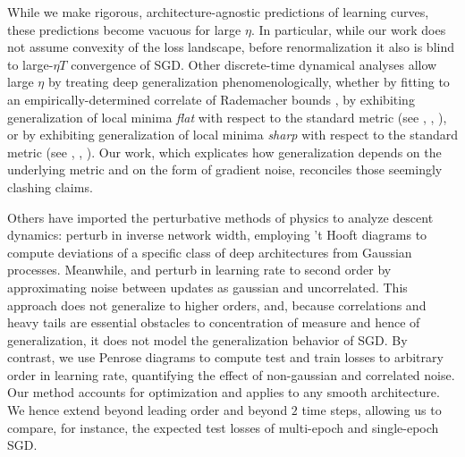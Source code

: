 \documentclass{article}
\begin{document}
    While we make rigorous, architecture-agnostic predictions of learning
    curves, these predictions become vacuous for large $\eta$.  In particular,
    while our work does not assume convexity of the loss landscape, before
    renormalization it also is blind to large-$\eta T$ convergence of SGD.
    Other discrete-time dynamical analyses allow large $\eta$ by treating deep
    generalization phenomenologically, whether by fitting to an
    empirically-determined correlate of Rademacher bounds \citep{li18}, by
    exhibiting generalization of local minima \emph{flat} with respect to the
    standard metric (see \citet{ho17}, \citet{ke17}, \citet{wa18}), or by
    exhibiting generalization of local minima \emph{sharp} with respect to the
    standard metric (see \citet{st56}, \citet{di17}, \citet{wu18}).  Our work,
    which explicates how generalization depends on the underlying
    metric and on the form of gradient noise, reconciles those
    seemingly clashing claims.
    

    Others have imported the perturbative methods of physics to analyze descent
    dynamics:  \citet{dy19} perturb in inverse network width, employing 't
    Hooft diagrams to compute deviations of a specific class of deep
    architectures from Gaussian processes.  Meanwhile, \cite{ch18} and
    \citet{li17} perturb in learning rate to second order by approximating
    noise between updates as gaussian and uncorrelated.  This approach does not
    generalize to higher orders, and, because correlations and heavy tails are
    essential obstacles to concentration of measure and hence of
    generalization, it does not model the generalization behavior of SGD.  By
    contrast, we use Penrose diagrams to compute test and train losses to
    arbitrary order in learning rate, quantifying the effect of non-gaussian
    and correlated noise.  Our method accounts for optimization and applies to
    any smooth architecture.  We hence extend \citet{ro18} beyond leading order
    and beyond $2$ time steps, allowing us to compare, for instance, the
    expected test losses of multi-epoch and single-epoch SGD.

\end{document}
